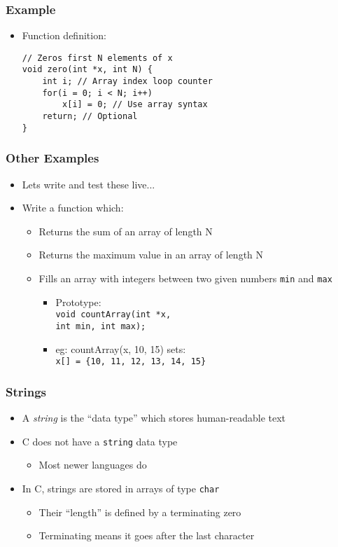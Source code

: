 \documentclass[14pt]{beamer}
\begin{document}
\begin{frame}[fragile]
\frametitle{Example}
\begin{itemize}
\item Function definition:
\begin{lstlisting}[style=CStyle]
// Zeros first N elements of x
void zero(int *x, int N) {
	int i; // Array index loop counter
	for(i = 0; i < N; i++)
		x[i] = 0; // Use array syntax
	return; // Optional
}
\end{lstlisting}
\end{itemize}
\end{frame}

\begin{frame}
\frametitle{Other Examples}
\begin{itemize}
\item Lets write and test these live...
\item Write a function which:
	\begin{itemize}	
		\item Returns the sum of an array of length N
		\item Returns the maximum value in an array of length N
		\item Fills an array with integers between two given numbers \texttt{min} and \texttt{max}
			\begin{itemize}
				\item Prototype:\\\texttt{void countArray(int *x,\\\quad \quad \quad \quad int min, int max);}
				\item eg: countArray(x, 10, 15) sets:\\ \texttt{x[] = \{10, 11, 12, 13, 14, 15\}}
			\end{itemize}
	\end{itemize}
\end{itemize}
\end{frame}

\begin{frame}
\frametitle{Strings}
\begin{itemize}
\item A \textit{string} is the ``data type'' which stores human-readable text
\item C does not have a \texttt{string} data type
	\begin{itemize}
		\item Most newer languages do
	\end{itemize}
\item In C, strings are stored in arrays of type \texttt{char}
	\begin{itemize}
		\item Their ``length'' is defined by a terminating zero
		\item Terminating means it goes after the last character
	\end{itemize}
\end{itemize}
\end{frame}
\end{document}
